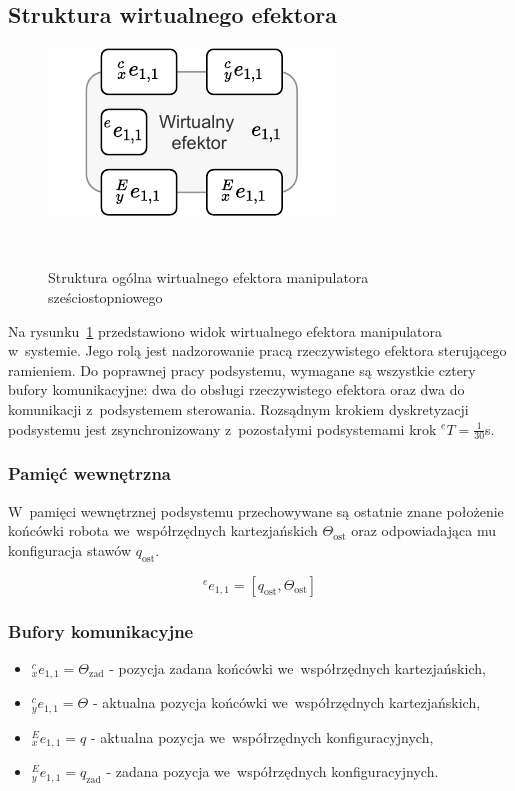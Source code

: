 \subsection{Struktura wirtualnego efektora}
\label{subsec:ve-manip-struktura}

\begin{figure}[ht]
    \centering
    \includegraphics[width=0.75\columnwidth]{figures/ISR-ve-manip-model.pdf}
    \caption{Struktura ogólna wirtualnego efektora manipulatora sześciostopniowego}\
    \label{fig:model-ve-manip}
\end{figure}

Na rysunku~\ref{fig:model-ve-manip} przedstawiono widok wirtualnego efektora manipulatora w~systemie. Jego rolą jest nadzorowanie pracą rzeczywistego efektora sterującego ramieniem. Do poprawnej pracy podsystemu, wymagane są wszystkie cztery bufory komunikacyjne: dwa do obsługi rzeczywistego efektora oraz dwa do komunikacji z~podsystemem sterowania. Rozsądnym krokiem dyskretyzacji podsystemu jest zsynchronizowany z~pozostałymi podsystemami krok ${}^{e}T = \frac{1}{30}$s.

\subsubsection{Pamięć wewnętrzna}
W~pamięci wewnętrznej podsystemu przechowywane są ostatnie znane położenie końcówki robota we~współrzędnych kartezjańskich $\Theta_{\mathrm{ost}}$ oraz odpowiadająca mu konfiguracja stawów $q_{\mathrm{ost}}$.

\begin{equation}
    {}^{e}e_{1,1} = [q_{\mathrm{ost}}, \Theta_{\mathrm{ost}}]
\end{equation}

\subsubsection{Bufory komunikacyjne}
\begin{itemize}
    \item ${}^{c}_{x}e_{1,1} = \Theta_{\mathrm{zad}}$ - pozycja zadana końcówki we~współrzędnych kartezjańskich,
    \item ${}^{c}_{y}e_{1,1} = \Theta$ - aktualna pozycja końcówki we~współrzędnych kartezjańskich,
    \item ${}^{E}_{x}e_{1,1} = q$ - aktualna pozycja we~współrzędnych konfiguracyjnych,
    \item ${}^{E}_{y}e_{1,1} = q_{\mathrm{zad}}$ - zadana pozycja we~współrzędnych konfiguracyjnych.
\end{itemize}

